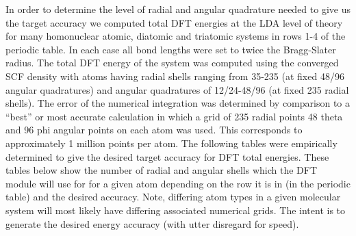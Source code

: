 In order to determine the level of radial and angular quadrature needed
to give us the target accuracy we computed total DFT energies 
at the LDA level of theory for many
homonuclear atomic, diatomic and triatomic systems in rows 1-4 of the
periodic table.  In each case all bond lengths were set to twice the
Bragg-Slater radius.  The total DFT energy of the system was computed
using the converged SCF density with atoms having radial shells
ranging from 35-235 (at fixed 48/96 angular quadratures) and angular
quadratures of 12/24-48/96 (at fixed 235 radial shells).  The error of
the numerical integration was determined by comparison to a ``best''
or most accurate calculation in which a grid of 235 radial points 48
theta and 96 phi angular points on each atom was used.  This
corresponds to approximately 1 million points per atom.  The following
tables were empirically determined to give the desired target accuracy
for DFT total energies.  These tables below show the number of radial and
angular shells which the DFT module will use for for a given atom
depending on the row it is in (in the periodic table) and the desired
accuracy.  Note, differing atom types in a given molecular system will
most likely have differing associated numerical grids.  The intent is
to generate the desired energy accuracy (with utter disregard for speed).



